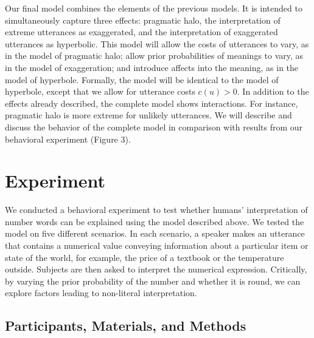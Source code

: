 \documentclass{article} %
\begin{document}
Our final model combines the elements of the previous models. It is intended to simultaneously capture three effects: pragmatic halo, the interpretation of extreme utterances as exaggerated, and the interpretation of exaggerated utterances as hyperbolic. This model will allow the costs of utterances to vary, as in the model of pragmatic halo; allow prior probabilities of meanings to vary, as in the model of exaggeration; and introduce affects into the meaning, as in the model of hyperbole. Formally, the model will be identical to the model of hyperbole, except that we allow for utterance costs $c(u) > 0$. In addition to the effects already described, the complete model shows interactions. For instance, pragmatic halo is more extreme for unlikely utterances. We will describe and discuss the behavior of the complete model in comparison with results from our behavioral experiment (Figure 3).




\section{Experiment}

We conducted a behavioral experiment to test whether humans' interpretation of number words can be explained using the model described above. We tested the model on five different scenarios. In each scenario, a speaker makes an utterance that contains a numerical value conveying information about a particular item or state of the world, for example, the price of a textbook or the temperature outside. Subjects are then asked to interpret the numerical expression. Critically, by varying the prior probability of the number and whether it is round, we can explore factors leading to non-literal interpretation.

\subsection{Participants, Materials, and Methods}
\end{document}
